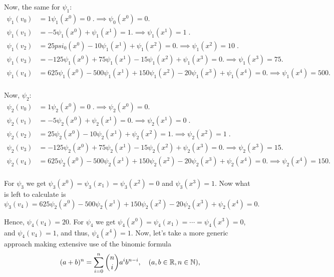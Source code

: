 \begin{xrcs}
\begin{xsol}
    Now, the same for $\psi_1$:
    \begin{equation}
      \begin{aligned}
      \psi_1(v_0) &= 1\psi_1(x^0) = 0 \;. \implies \psi_0(x^0) = 0.\\
      \psi_1(v_1) &= -5\psi_1(x^0)+\psi_1(x^1) = 1. \implies \psi_1(x^1) = 1 \;.\\
      \psi_1(v_2) &= 25psi_0(x^0)-10\psi_1(x^1)+\psi_1(x^2)= 0. \implies \psi_1(x^2) = 10 \;.\\
      \psi_1(v_3) &= -125\psi_1(x^0)+75\psi_1(x^1)-15\psi_1(x^2)+\psi_1(x^3) = 0. \implies \psi_1(x^3) = 75.\\
      \psi_1(v_4) &= 625\psi_1(x^0)-500\psi_1(x^1)+150\psi_1(x^2)-20\psi_1(x^3)+\psi_1(x^4) = 0 . \implies \psi_1(x^4) = 500 .\\
      \end{aligned}
    \end{equation}

    Now, $\psi_2$:
    \begin{equation}
      \begin{aligned}
      \psi_2(v_0) &= 1\psi_2(x^0) = 0 \;. \implies \psi_2(x^0) = 0.\\
      \psi_2(v_1) &= -5\psi_2(x^0)+\psi_2(x^1) = 0. \implies \psi_2(x^1) = 0 \;.\\
      \psi_2(v_2) &= 25\psi_2(x^0)-10\psi_2(x^1)+\psi_2(x^2)= 1. \implies \psi_2(x^2) = 1 \;.\\
      \psi_2(v_3) &= -125\psi_2(x^0)+75\psi_2(x^1)-15\psi_2(x^2)+\psi_2(x^3) = 0. \implies \psi_2(x^3) = 15.\\
      \psi_2(v_4) &= 625\psi_2(x^0)-500\psi_2(x^1)+150\psi_2(x^2)-20\psi_2(x^3)+\psi_2(x^4) = 0 . \implies \psi_2(x^4) = 150 .\\
      \end{aligned}
    \end{equation}

   For $\psi_3$ we get $\psi_3(x^0) = \psi_3(x_1) = \psi_3(x^2) = 0$ and $\psi_3 (x^3) = 1$. Now what is left to calculate is
   \begin{equation}
     \psi_3(v_4) = 625\psi_2(x^0)-500\psi_2(x^1)+150\psi_2(x^2)-20\psi_2(x^3)+\psi_2(x^4) = 0.
   \end{equation}

    Hence, $\psi_4(v_4) = 20.$ For $\psi_4$ we get $\psi_4(x^0) = \psi_4(x_1) = \cdots = \psi_4(x^3) = 0$, and $\psi_4(v_4) = 1$, and thus, $\psi_4(x^4) = 1$. Now, let's take a more generic approach making extensive use of the binomic formula
    \begin{equation}
      (a+b)^n = \sum_{i=0}^{n} \binom{n}{i} a^{i}b^{n-i}, \quad (a,b \in \mathbb{R}, n\in \mathbb{N}),
    \end{equation}


\end{xsol}
\end{xrcs}
